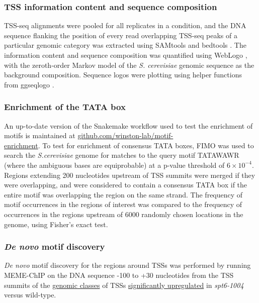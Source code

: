 \subsubsection{TSS information content and sequence composition}
\label{subsubsec:tss_seqlogos}

TSS-seq alignments were pooled for all replicates in a condition, and the DNA sequence flanking the position of every read overlapping TSS-seq peaks of a particular genomic category was extracted using SAMtools \citep{li2009} and bedtools \citep{quinlan2010}.
The information content and sequence composition was quantified using WebLogo \citep{crooks2004}, with the zeroth-order Markov model of the \textit{S. cerevisiae} genomic sequence as the background composition.
Sequence logos were plotting using helper functions from ggseqlogo \citep{wagih2017}.

\subsubsection{Enrichment of the TATA box}

An up-to-date version of the Snakemake \citep{koster2012} workflow used to test the enrichment of motifs is maintained at \href{https://github.com/winston-lab/motif-enrichment}{github.com/winston-lab/motif-\\enrichment}.
To test for enrichment of consensus TATA boxes, FIMO \citep{grant2011} was used to search the \textit{S.cerevisiae} genome for matches to the query motif TATAWAWR (where the ambiguous bases are equiprobable) at a p-value threshold of $6 \times 10^{-4}$.
Regions extending 200 nucleotides upstream of TSS summits were merged if they were overlapping, and were considered to contain a consensus TATA box if the entire motif was overlapping the region on the same strand.
The frequency of motif occurrences in the regions of interest was compared to the frequency of occurrences in the regions upstream of 6000 randomly chosen locations in the genome, using Fisher's exact test.

\subsubsection{\textit{De novo} motif discovery}
\label{subsubsec:denovo_motif_discovery}

\textit{De novo} motif discovery for the regions around TSSs was performed by running MEME-ChIP \citep{machanick2011} on the DNA sequence -100 to +30 nucleotides from the TSS summits of the \hyperref[subsubsec:tss_peak_classification]{genomic classes} of TSSs \hyperref[subsubsec:tss_differential_expression]{significantly upregulated} in \textit{spt6-1004} versus wild-type.

